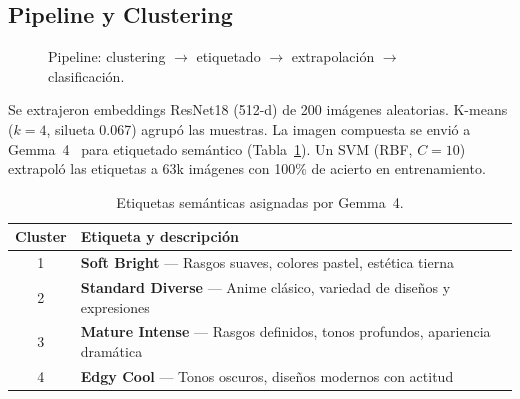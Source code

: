 \documentclass[10pt,a4paper]{article}
\begin{document}
\subsection{Pipeline y Clustering}
\vspace{-4pt}
\begin{figure}[ht]
\centering
{}
\caption{Pipeline: clustering $\to$ etiquetado $\to$ extrapolación $\to$ clasificación.}
\label{fig:pipeline}
\end{figure}
\vspace{-4pt}

Se extrajeron embeddings ResNet18 (512-d) de 200 imágenes aleatorias. K-means ($k=4$, silueta 0.067) agrupó las muestras. La imagen compuesta se envió a Gemma~4~\cite{gemma42024} para etiquetado semántico (Tabla~\ref{tab:labels}). Un SVM (RBF, $C=10$) extrapoló las etiquetas a 63k imágenes con 100\% de acierto en entrenamiento.

\begin{table}[ht]
\centering\small
\caption{Etiquetas semánticas asignadas por Gemma~4.}
\begin{tabular}{cl}
\toprule
\textbf{Cluster} & \textbf{Etiqueta y descripción} \\
\midrule
1 & \textbf{Soft Bright} --- Rasgos suaves, colores pastel, estética tierna \\
2 & \textbf{Standard Diverse} --- Anime clásico, variedad de diseños y expresiones \\
3 & \textbf{Mature Intense} --- Rasgos definidos, tonos profundos, apariencia dramática \\
4 & \textbf{Edgy Cool} --- Tonos oscuros, diseños modernos con actitud \\
\bottomrule
\end{tabular}
\label{tab:labels}
\end{table}
\end{document}
